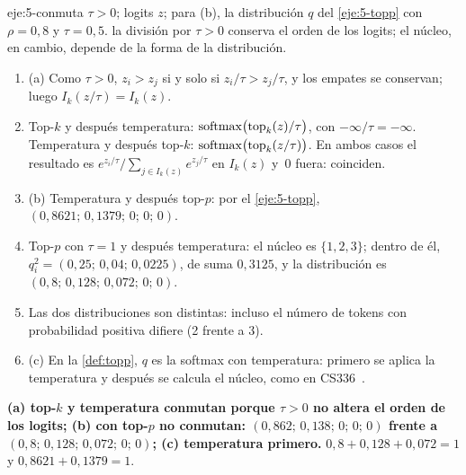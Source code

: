 \begin{solucion}{eje:5-conmuta}
\datos $\tau>0$; logits $z$; para (b), la distribución $q$ del \cref{eje:5-topp} con $\rho=0{,}8$ y $\tau=0{,}5$.
\planteamiento la división por $\tau>0$ conserva el orden de los logits; el núcleo, en cambio, depende de la forma de la distribución.
\pasos
\begin{enumerate}[label=\arabic*.]
  \item (a) Como $\tau>0$, $z_i>z_j$ si y solo si $z_i/\tau>z_j/\tau$, y los empates se conservan; luego $I_k(z/\tau)=I_k(z)$.
  \item Top-$k$ y después temperatura: $\operatorname{softmax}\bigl(\operatorname{top}_k(z)/\tau\bigr)$, con $-\infty/\tau=-\infty$. Temperatura y después top-$k$: $\operatorname{softmax}\bigl(\operatorname{top}_k(z/\tau)\bigr)$. En ambos casos el resultado es $e^{z_i/\tau}/\sum_{j\in I_k(z)}e^{z_j/\tau}$ en $I_k(z)$ y~0 fuera: coinciden.
  \item (b) Temperatura y después top-$p$: por el \cref{eje:5-topp}, $(0{,}8621;\allowbreak\,0{,}1379;\allowbreak\,0;\allowbreak\,0;\allowbreak\,0)$.
  \item Top-$p$ con $\tau=1$ y después temperatura: el núcleo es $\{1,2,3\}$; dentro de él, $q_i^{2}=(0{,}25;\allowbreak\,0{,}04;\allowbreak\,0{,}0225)$, de suma $0{,}3125$, y la distribución es $(0{,}8;\allowbreak\,0{,}128;\allowbreak\,0{,}072;\allowbreak\,0;\allowbreak\,0)$.
  \item Las dos distribuciones son distintas: incluso el número de tokens con probabilidad positiva difiere (2 frente a 3).
  \item (c) En la \cref{def:topp}, $q$ es la softmax con temperatura: primero se aplica la temperatura y después se calcula el núcleo, como en CS336~\cite[§6]{cs336}.
\end{enumerate}
\resultado \textbf{(a) top-$k$ y temperatura conmutan porque $\tau>0$ no altera el orden de los logits; (b) con top-$p$ no conmutan: $(0{,}862;\allowbreak\,0{,}138;\allowbreak\,0;\allowbreak\,0;\allowbreak\,0)$ frente a $(0{,}8;\allowbreak\,0{,}128;\allowbreak\,0{,}072;\allowbreak\,0;\allowbreak\,0)$; (c) temperatura primero.}
\comprobacion $0{,}8+0{,}128+0{,}072=1$ y $0{,}8621+0{,}1379=1$.
\end{solucion}

